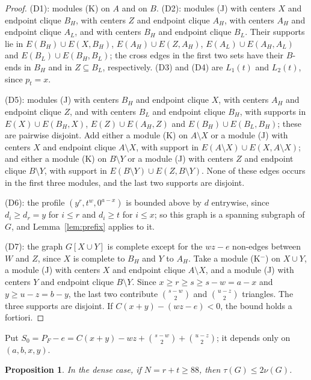 \documentclass{amsart}
\newtheorem{proposition}[theorem]{Proposition}
\theoremstyle{definition}
\theoremstyle{remark}
\numberwithin{equation}{section}
\numberwithin{table}{section}
\begin{document}
\begin{proof}
(D1): modules (K) on $A$ and on $B$. (D2): modules (J) with centers $X$ and endpoint clique $B_H$, with centers $Z$ and endpoint clique $A_H$, with centers $A_H$ and endpoint clique $A_L$, and with centers $B_H$ and endpoint clique $B_L$. Their supports lie in $E(B_H)\cup E(X,B_H)$, $E(A_H)\cup E(Z,A_H)$, $E(A_L)\cup E(A_H,A_L)$ and $E(B_L)\cup E(B_H,B_L)$; the cross edges in the first two sets have their $B$-ends in $B_H$ and in $Z\subseteq B_L$, respectively. (D3) and (D4) are $L_1(t)$ and $L_2(t)$, since $p_t=x$.

(D5): modules (J) with centers $B_H$ and endpoint clique $X$, with centers $A_H$ and endpoint clique $Z$, and with centers $B_L$ and endpoint clique $B_H$, with supports in $E(X)\cup E(B_H,X)$, $E(Z)\cup E(A_H,Z)$ and $E(B_H)\cup E(B_L,B_H)$; these are pairwise disjoint. Add either a module (K) on $A\setminus X$ or a module (J) with centers $X$ and endpoint clique $A\setminus X$, with support in $E(A\setminus X)\cup E(X,A\setminus X)$; and either a module (K) on $B\setminus Y$ or a module (J) with centers $Z$ and endpoint clique $B\setminus Y$, with support in $E(B\setminus Y)\cup E(Z,B\setminus Y)$. None of these edges occurs in the first three modules, and the last two supports are disjoint.

(D6): the profile $(y^r,t^w,0^{a-x})$ is bounded above by $d$ entrywise, since $d_i\ge d_r=y$ for $i\le r$ and $d_i\ge t$ for $i\le x$; so this graph is a spanning subgraph of $G$, and Lemma~\ref{lem:prefix} applies to it.

(D7): the graph $G[X\cup Y]$ is complete except for the $wz-e$ non-edges between $W$ and $Z$, since $X$ is complete to $B_H$ and $Y$ to $A_H$. Take a module (K$^-$) on $X\cup Y$, a module (J) with centers $X$ and endpoint clique $A\setminus X$, and a module (J) with centers $Y$ and endpoint clique $B\setminus Y$. Since $x\ge r\ge s\ge s-w=a-x$ and $y\ge u-z=b-y$, the last two contribute $\binom{s-w}2$ and $\binom{u-z}2$ triangles. The three supports are disjoint. If $C(x+y)-(wz-e)<0$, the bound holds a fortiori.
\end{proof}

Put $S_0=P_F-e=C(x+y)-wz+\binom{s-w}2+\binom{u-z}2$; it depends only on $(a,b,x,y)$.

\begin{proposition}\label{prop:denselarge}
In the dense case, if $N=r+t\ge88$, then $\tau(G)\le2\nu(G)$.
\end{proposition}
\end{document}

